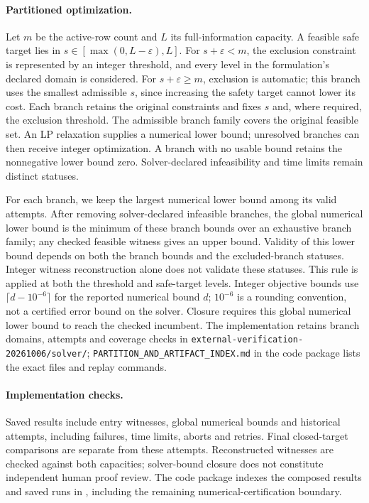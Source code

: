 \paragraph{Partitioned optimization.}
Let $m$ be the active-row count and $L$ its full-information capacity. A feasible safe target lies in $s\in[\max(0,L-\varepsilon),L]$. For $s+\varepsilon<m$, the exclusion constraint is represented by an integer threshold, and every level in the formulation's declared domain is considered. For $s+\varepsilon\ge m$, exclusion is automatic; this branch uses the smallest admissible $s$, since increasing the safety target cannot lower its cost. Each branch retains the original constraints and fixes $s$ and, where required, the exclusion threshold. The admissible branch family covers the original feasible set. An LP relaxation supplies a numerical lower bound; unresolved branches can then receive integer optimization. A branch with no usable bound retains the nonnegative lower bound zero. Solver-declared infeasibility and time limits remain distinct statuses.

For each branch, we keep the largest numerical lower bound among its valid attempts. After removing solver-declared infeasible branches, the global numerical lower bound is the minimum of these branch bounds over an exhaustive branch family; any checked feasible witness gives an upper bound. Validity of this lower bound depends on both the branch bounds and the excluded-branch statuses. Integer witness reconstruction alone does not validate these statuses. This rule is applied at both the threshold and safe-target levels. Integer objective bounds use $\lceil d-10^{-6}\rceil$ for the reported numerical bound $d$; $10^{-6}$ is a rounding convention, not a certified error bound on the solver. Closure requires this global numerical lower bound to reach the checked incumbent. The implementation retains branch domains, attempts and coverage checks in \nolinkurl{external-verification-20261006/solver/}; \nolinkurl{PARTITION_AND_ARTIFACT_INDEX.md} in the code package lists the exact files and replay commands.

\paragraph{Implementation checks.}
Saved results include entry witnesses, global numerical bounds and historical attempts, including failures, time limits, aborts and retries. Final closed-target comparisons are separate from these attempts. Reconstructed witnesses are checked against both capacities; solver-bound closure does not constitute independent human proof review. The code package indexes the composed results and saved runs in \allowbreak{}\allowbreak{}\allowbreak{}, including the remaining numerical-certification boundary.

